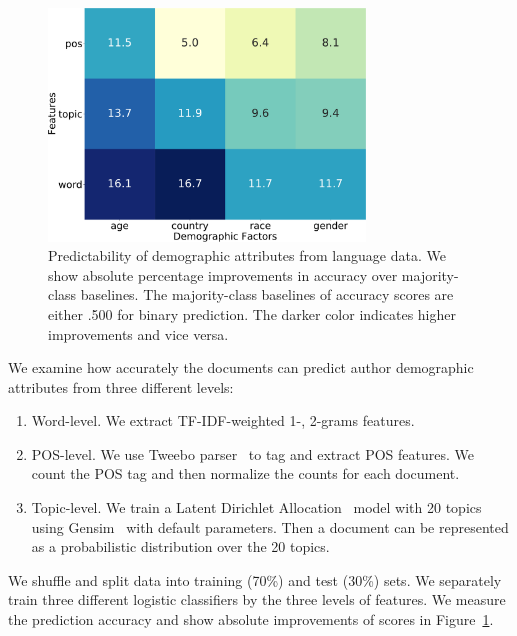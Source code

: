 \begin{figure}[tb!]
\centering
\includegraphics[width=0.75\textwidth]{images/chapter5/predictability.pdf}
\caption{Predictability of demographic attributes from language
data. We show absolute percentage improvements in accuracy over majority-class baselines. The majority-class baselines of accuracy scores are either .500 for binary prediction. The darker color indicates higher improvements and vice versa.}
\label{chap5:fig:predictability}
\end{figure}

We examine how accurately the documents can predict author demographic attributes from three different levels:
\begin{enumerate}
    \item Word-level. We extract TF-IDF-weighted 1-, 2-grams features.
    \item POS-level. We use Tweebo parser~\cite{kong2014dependency} to tag and extract POS features. We count the POS tag and then normalize the counts for each document.
    \item Topic-level. We train a Latent Dirichlet Allocation~\cite{blei2003latent} model with 20 topics using Gensim~\cite{rehurek2010software} with default parameters. Then a document can be represented as a probabilistic distribution over the 20 topics.
\end{enumerate}

We shuffle and split data into training (70\%) and test (30\%) sets.
We separately train three different logistic classifiers by the three levels of features.
We measure the prediction accuracy and show absolute improvements of scores in Figure~\ref{chap5:fig:predictability}.


